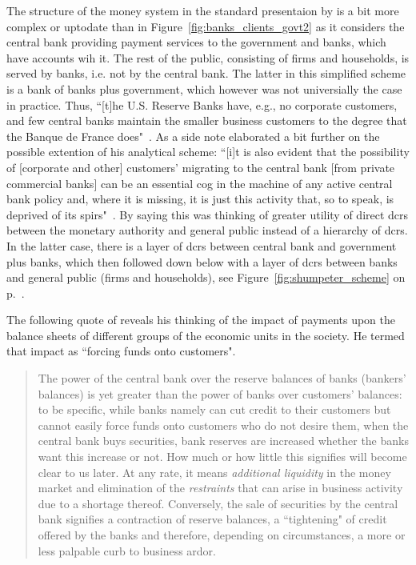 The structure of the money system in the standard presentaion by \cite{schumpeter2014} is a bit more complex or uptodate than in Figure~\ref{fig:banks_clients_govt2} as it considers the central bank providing payment services to the government and banks, which have accounts wih it. The rest of the public, consisting of firms and households, is served by banks, i.e. not by the central bank. The latter in this simplified scheme is a bank of banks plus government, which however was not universially the case in practice. Thus, ``[t]he U.S. Reserve Banks have, e.g., no corporate customers, and few central banks maintain the smaller business customers to the degree that the Banque de France does"~\citep[p.~167]{schumpeter2014}. As a side note \citeauthor{schumpeter2014} elaborated a bit further on the possible extention of his analytical scheme: ``[i]t is also evident that the possibility of [corporate and other] customers' migrating to the central bank [from private commercial banks] can be an essential cog in the machine of any active central bank policy and, where it is missing, it is just this activity that, so to speak, is deprived of its spirs"~\citep[pp.~167-168]{schumpeter2014}. By saying this \citeauthor{schumpeter2014} was thinking of greater utility of direct \acfp{dcr} between the monetary authority and general public instead of a hierarchy of \acp{dcr}. In the latter case, there is a layer of \acp{dcr} between central bank and government plus banks, which then followed down below with a layer of \acp{dcr} between banks and general public (firms and households), see Figure~\ref{fig:shumpeter_scheme} on p.~\pageref{fig:shumpeter_scheme}.

The following quote of \cite{schumpeter2014} reveals his thinking of the impact of payments upon the balance sheets of different groups of the economic units in the society. He termed that impact as ``forcing funds onto customers". 

\begin{quote}
The power of the central bank over the reserve balances of banks (bankers' balances) is yet greater than the power of banks over customers' balances: to be specific, while banks
namely can cut credit to their customers but cannot easily force funds onto
customers who do not desire them, when the central bank buys securities, bank
reserves are increased whether the banks want this increase or not. How much or
how little this signifies will become clear to us later. At any rate, it means
\textit{additional liquidity} in the money market and elimination of the \textit{restraints} that can arise in business activity due to a shortage thereof. Conversely, the sale of
securities by the central bank signifies a contraction of reserve balances, a
``tightening" of credit offered by the banks and therefore, depending on
circumstances, a more or less palpable curb to business ardor.~\citep[p.~174, emphasis original]{schumpeter2014} 
\end{quote}

